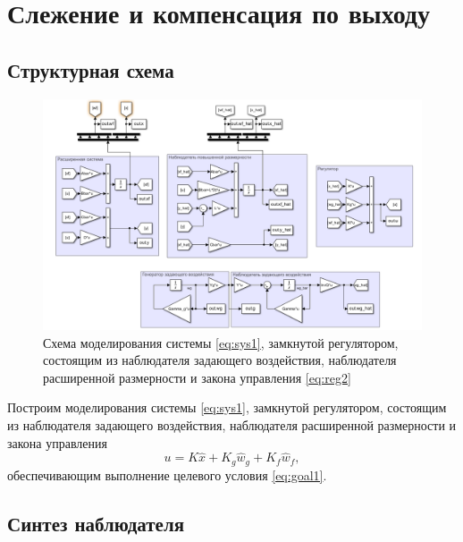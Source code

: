 \section{Слежение и компенсация по выходу}

\subsection{Структурная схема}

\begin{figure}[H]
    \centering
    \includegraphics[width=\linewidth]{figs/20slx.png}
    \caption{Схема моделирования системы \eqref{eq:sys1}, замкнутой регулятором, состоящим
    из наблюдателя задающего воздействия, наблюдателя расширенной размерности
    и закона управления \eqref{eq:reg2}}
    \label{fig:sys2}
\end{figure}

Построим моделирования системы \eqref{eq:sys1}, замкнутой регулятором, состоящим
из наблюдателя задающего воздействия, наблюдателя расширенной размерности
и закона управления
\begin{equation}
    \label{eq:reg2}
    u=K\hat x+K_g\hat w_g+K_f\hat w_f,
\end{equation}
обеспечивающим выполнение целевого условия \eqref{eq:goal1}.

\subsection{Синтез наблюдателя}

